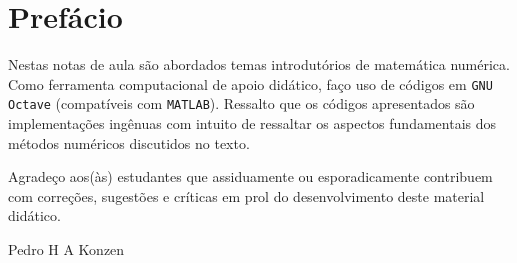 
\chapter*{Prefácio}\label{c_prefacio}

Nestas notas de aula são abordados temas introdutórios de matemática numérica. Como ferramenta computacional de apoio didático, faço uso de códigos em \verb+GNU Octave+ (compatíveis com \verb+MATLAB+). Ressalto que os códigos apresentados são implementações ingênuas com intuito de ressaltar os aspectos fundamentais dos métodos numéricos discutidos no texto.

Agradeço aos(às) estudantes que assiduamente ou esporadicamente contribuem com correções, sugestões e críticas em prol do desenvolvimento deste material didático.

\begin{flushright}
  Pedro H A Konzen
\end{flushright}

